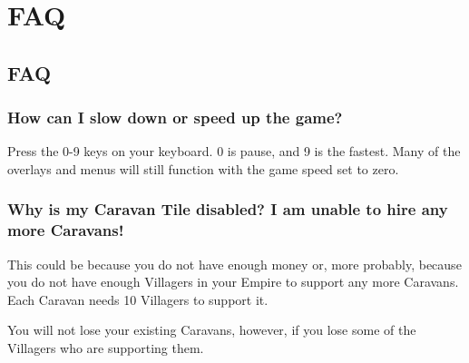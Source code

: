 
\chapter{FAQ}

\section{FAQ} %



\subsection{How can I slow down or speed up the game?}


Press the 0-9 keys on your keyboard. 0 is pause, and 9 is the fastest. Many of the overlays and menus will still function with the game speed set to zero.

\subsection{Why is my Caravan Tile disabled? I am unable to hire any more Caravans!}

This could be because you do not have enough money or, more probably, because you do not have enough Villagers in your Empire to support any more Caravans. Each Caravan needs 10 Villagers to support it.

You will not lose your existing Caravans, however, if you lose some of the Villagers who are supporting them.

